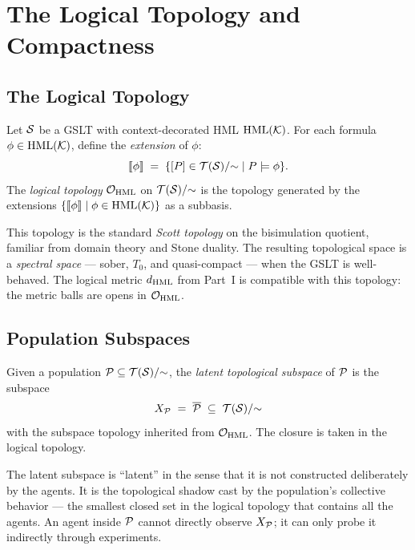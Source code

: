 \chapter{The Logical Topology and Compactness}
\label{sec:topology}

\section{The Logical Topology}

\begin{definition}
\label{def:log-top}
Let $\mathcal{S}$ be a GSLT with context-decorated HML $\mathrm{HML}(\mathcal{K})$.
For each formula $\phi \in \mathrm{HML}(\mathcal{K})$, define the
\emph{extension} of $\phi$:
\[
  \llbracket\phi\rrbracket \;=\; \{ [P] \in \mathcal{T}(\mathcal{S})/{\sim} \mid P \models \phi \}.
\]
The \emph{logical topology} $\mathcal{O}_{\mathrm{HML}}$ on
$\mathcal{T}(\mathcal{S})/{\sim}$ is the topology generated by the
extensions $\{ \llbracket\phi\rrbracket \mid \phi \in \mathrm{HML}(\mathcal{K}) \}$ as a
subbasis.
\end{definition}

\begin{remark}
This topology is the standard \emph{Scott topology} on the
bisimulation quotient, familiar from domain theory and Stone duality.
The resulting topological space is a \emph{spectral space} --- sober,
$T_0$, and quasi-compact --- when the GSLT is well-behaved.
The logical metric $d_{\mathrm{HML}}$ from Part~I is compatible
with this topology: the metric balls are opens in $\mathcal{O}_{\mathrm{HML}}$.
\end{remark}

\section{Population Subspaces}

\begin{definition}
Given a population $\mathcal{P} \subseteq \mathcal{T}(\mathcal{S})/{\sim}$, the
\emph{latent topological subspace} of $\mathcal{P}$ is the subspace
\[
  X_{\mathcal{P}} \;=\; \overline{\mathcal{P}} \;\subseteq\; \mathcal{T}(\mathcal{S})/{\sim}
\]
with the subspace topology inherited from $\mathcal{O}_{\mathrm{HML}}$.
The closure is taken in the logical topology.
\end{definition}

\begin{remark}
The latent subspace is ``latent'' in the sense that it is not
constructed deliberately by the agents.
It is the topological shadow cast by the population's collective
behavior --- the smallest closed set in the logical topology that
contains all the agents.
An agent inside $\mathcal{P}$ cannot directly observe $X_{\mathcal{P}}$;
it can only probe it indirectly through experiments.
\end{remark}


